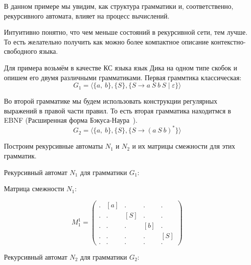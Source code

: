 \begin{example}

В данном примере мы увидим, как структура грамматики и, соответственно, рекурсивного автомата, влияет на процесс вычислений.

Интуитивно понятно, что чем меньше состояний в рекурсивной сети, тем лучше.
То есть желательно получить как можно более компактное описание контекстно-свободного языка.

Для примера возьмём в качестве КС языка язык Дика на одном типе скобок и опишем его двумя различными грамматиками.
Первая граммтика классическая:
$$
G_1 = \langle \{a,\ b\}, \{ S \}, \{S \to a \ S \ b \ S \mid \varepsilon  \} \rangle
$$

Во второй грамматике мы будем использовать конструкции регулярных выражений в правой части правил.
То есть вторая грамматика находитмся в EBNF (Расширенная форма Бэкуса-Наура~\cite{Hemerik2009, Wirth1977}).
$$
G_2 = \langle \{a, \ b\}, \{S\}, \{S \to (a \ S \ b)^{*}\} \rangle
$$

Построим рекурсивные автоматы $N_1$ и $N_2$ и их матрицы смежности для этих грамматик.

Рекурсивный автомат $N_1$ для грамматики $G_1$:
\begin{center}
\end{center}

Матрица смежности $N_1$:

$$
M_1^1 =
\begin{pmatrix}
. & [a] & .   & .   & .  \\
. & .   & [S] & .   & .  \\
. & .   & .   & [b] & .  \\
. & .   & .   & .   & [S] \\
. & .   & .   & .   & .
\end{pmatrix}
$$


Рекурсивный автомат $N_2$ для грамматики $G_2$:
\begin{center}
\end{center}


\end{example}
